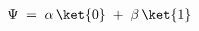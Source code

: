 \documentclass[preview]{standalone}
\begin{document}
\begin{align*}
\Psi \;=\; \alpha \, \ket{0} \;+\; \beta \, \ket{1}
\end{align*}
\end{document}
